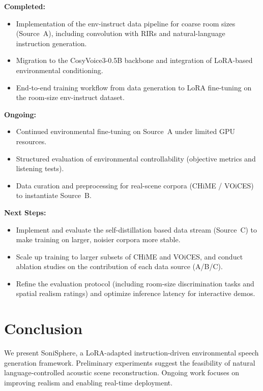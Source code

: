 \documentclass{article}
\begin{document}
\textbf{Completed:}
\begin{itemize}
\item Implementation of the env-instruct data pipeline for coarse room sizes (Source~A), including convolution with RIRs and natural-language instruction generation.
\item Migration to the CosyVoice3-0.5B backbone and integration of LoRA-based environmental conditioning.
\item End-to-end training workflow from data generation to LoRA fine-tuning on the room-size env-instruct dataset.
\end{itemize}

\textbf{Ongoing:}
\begin{itemize}
\item Continued environmental fine-tuning on Source~A under limited GPU resources.
\item Structured evaluation of environmental controllability (objective metrics and listening tests).
\item Data curation and preprocessing for real-scene corpora (CHiME / VOiCES) to instantiate Source~B.
\end{itemize}

\textbf{Next Steps:}
\begin{itemize}
\item Implement and evaluate the self-distillation based data stream (Source~C) to make training on larger, noisier corpora more stable.
\item Scale up training to larger subsets of CHiME and VOiCES, and conduct ablation studies on the contribution of each data source (A/B/C).
\item Refine the evaluation protocol (including room-size discrimination tasks and spatial realism ratings) and optimize inference latency for interactive demos.
\end{itemize}

\section{Conclusion}

We present SoniSphere, a LoRA-adapted instruction-driven environmental speech generation framework. Preliminary experiments suggest the feasibility of natural language-controlled acoustic scene reconstruction. Ongoing work focuses on improving realism and enabling real-time deployment.



\end{document}
